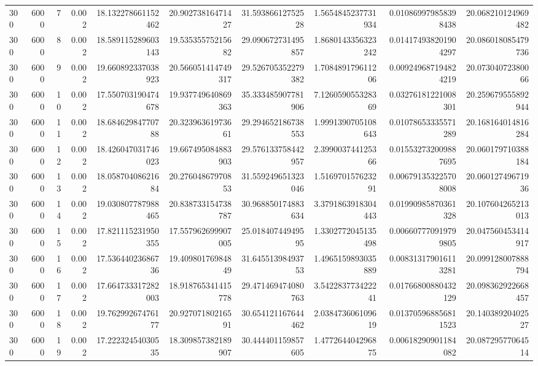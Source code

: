 \begin{tabular}{lrrrrrrrrr}
300 & 6000 & 7 & 0.002 & 18.132278661152462 & 20.90273816471427 & 31.59386612752528 & 1.5654845237731934 & 0.010869979858398438 & 20.068210124969482 \\
300 & 6000 & 8 & 0.002 & 18.589115289603143 & 19.53535575215682 & 29.090672731495857 & 1.8680143356323242 & 0.014174938201904297 & 20.086018085479736 \\
300 & 6000 & 9 & 0.002 & 19.660892337038923 & 20.566051414749317 & 29.526705352279382 & 1.708489179611206 & 0.009249687194824219 & 20.07304072380066 \\
300 & 6000 & 10 & 0.002 & 17.550703190474678 & 19.937749640869363 & 35.333485907781906 & 7.126059055328369 & 0.03276181221008301 & 20.259679555892944 \\
300 & 6000 & 11 & 0.002 & 18.68462984770788 & 20.32396361973661 & 29.294652186738553 & 1.9991390705108643 & 0.01078653335571289 & 20.168164014816284 \\
300 & 6000 & 12 & 0.002 & 18.426047031746023 & 19.667495084883903 & 29.576133758442957 & 2.399003744125366 & 0.015532732009887695 & 20.060179710388184 \\
300 & 6000 & 13 & 0.002 & 18.05870408621684 & 20.27604867970853 & 31.559249651323046 & 1.516970157623291 & 0.006791353225708008 & 20.06012749671936 \\
300 & 6000 & 14 & 0.002 & 19.030807787988465 & 20.838733154738787 & 30.968850174883634 & 3.3791863918304443 & 0.01990985870361328 & 20.107604265213013 \\
300 & 6000 & 15 & 0.002 & 17.821115231950355 & 17.557962699907005 & 25.01840744949595 & 1.3302772045135498 & 0.006607770919799805 & 20.047560453414917 \\
300 & 6000 & 16 & 0.002 & 17.53644023686736 & 19.40980176984849 & 31.64551398493753 & 1.4965159893035889 & 0.008313179016113281 & 20.099128007888794 \\
300 & 6000 & 17 & 0.002 & 17.664733317282003 & 18.918765341415778 & 29.471469474080763 & 3.542283773422241 & 0.01766800880432129 & 20.098362922668457 \\
300 & 6000 & 18 & 0.002 & 19.76299267476177 & 20.92707180216591 & 30.654121167644462 & 2.038473606109619 & 0.013705968856811523 & 20.14038920402527 \\
300 & 6000 & 19 & 0.002 & 17.22232454030535 & 18.309857382189907 & 30.444401159857605 & 1.477264404296875 & 0.00618290901184082 & 20.08729577064514 \\
\hline
\end{tabular}
